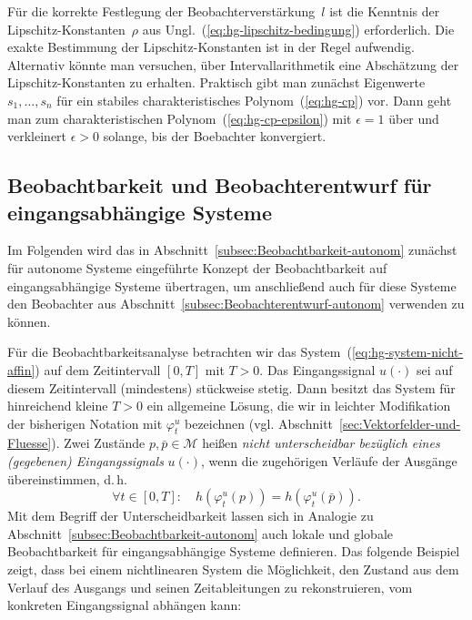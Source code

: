 \begin{remark}
Für die korrekte Festlegung der Beobachterverstärkung~$l$ ist die
Kenntnis der Lipschitz-Konstanten~$\rho$ aus Ungl.~(\ref{eq:hg-lipschitz-bedingung})
erforderlich. Die exakte Bestimmung der Lipschitz-Konstanten ist in
der Regel aufwendig. Alternativ könnte man versuchen, über Intervallarithmetik
eine Abschätzung der Lipschitz-Konstanten zu erhalten. Praktisch gibt
man zunächst Eigenwerte $s_{1},\ldots,s_{n}$ für ein stabiles charakteristisches
Polynom~(\ref{eq:hg-cp}) vor. Dann geht man zum charakteristischen
Polynom~(\ref{eq:hg-cp-epsilon}) mit $\epsilon=1$ über und verkleinert
$\epsilon>0$ solange, bis der Boebachter konvergiert. 
\end{remark}

\subsection{Beobachtbarkeit und Beobachterentwurf für eingangsabhängige Systeme\label{subsec:Beobachterentwurf-mit-eingang}}

Im Folgenden wird das in Abschnitt~\ref{subsec:Beobachtbarkeit-autonom}
zunächst für autonome Systeme eingeführte Konzept der Beobachtbarkeit
auf eingangsabhängige Systeme übertragen, um anschließend auch für
diese Systeme den Beobachter aus Abschnitt~\ref{subsec:Beobachterentwurf-autonom}
verwenden zu können.

Für die Beobachtbarkeitsanalyse betrachten wir das System~(\ref{eq:hg-system-nicht-affin})
auf dem Zeit\-inter\-vall $[0,T]$ mit $T>0$. Das Eingangssignal
$u(\cdot)$ sei auf diesem Zeit\-inter\-vall (mindestens) stückweise
stetig. Dann besitzt das System für hinreichend kleine $T>0$ ein
allgemeine Lösung, die wir in leichter Modifikation der bisherigen
Notation mit $\varphi_{t}^{u}$ bezeichnen (vgl. Abschnitt~\ref{sec:Vektorfelder-und-Fluesse}).
Zwei Zustände $p,\bar{p}\in\mathcal{M}$ heißen \emph{nicht unterscheidbar
bezüglich eines (gegebenen) Eingangssignals} $u(\cdot)$,
wenn die zugehörigen Verläufe der Ausgänge übereinstimmen, d.\,h.
\[
\forall t\in[0,T]:\quad h(\varphi_{t}^{u}(p))=h(\varphi_{t}^{u}(\bar{p})).
\]
Mit dem Begriff der Unterscheidbarkeit lassen sich in Analogie zu
Abschnitt~\ref{subsec:Beobachtbarkeit-autonom} auch lokale und globale
Beobachtbarkeit für eingangsabhängige Systeme definieren. Das folgende
Beispiel zeigt, dass bei einem nichtlinearen System die Möglichkeit,
den Zustand aus dem Verlauf des Ausgangs und seinen Zeitableitungen
zu rekonstruieren, vom konkreten Eingangssignal abhängen kann:

